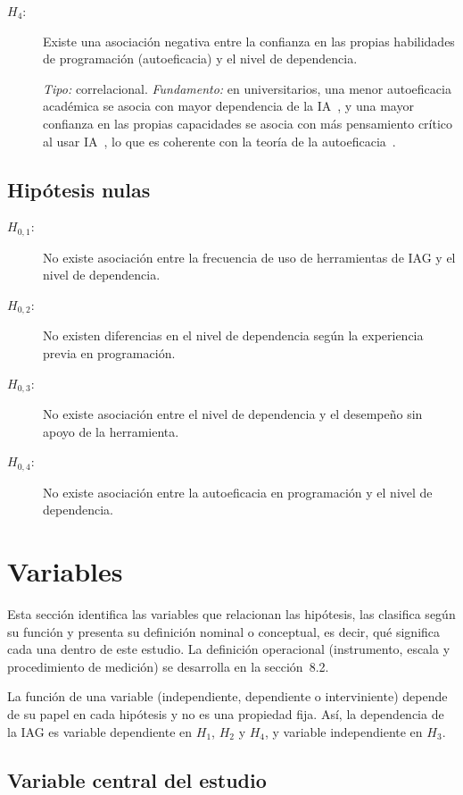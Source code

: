 \documentclass[12pt,letterpaper]{article}
\numberwithin{table}{section}
\numberwithin{figure}{section}
\begin{document}
\begin{description}
  \item[$H_4$:] Existe una asociación negativa entre la confianza en las propias habilidades de programación (autoeficacia) y el nivel de dependencia.

  \emph{Tipo:} correlacional. \emph{Fundamento:} en universitarios, una menor autoeficacia académica se asocia con mayor dependencia de la IA~\cite{zhang2024dependency}, y una mayor confianza en las propias capacidades se asocia con más pensamiento crítico al usar IA~\cite{lee2025impact}, lo que es coherente con la teoría de la autoeficacia~\cite{bandura1977self}.
\end{description}

\subsection{Hipótesis nulas}

\begin{description}
  \item[$H_{0,1}$:] No existe asociación entre la frecuencia de uso de herramientas de IAG y el nivel de dependencia.
  \item[$H_{0,2}$:] No existen diferencias en el nivel de dependencia según la experiencia previa en programación.
  \item[$H_{0,3}$:] No existe asociación entre el nivel de dependencia y el desempeño sin apoyo de la herramienta.
  \item[$H_{0,4}$:] No existe asociación entre la autoeficacia en programación y el nivel de dependencia.
\end{description}

\section{Variables}

Esta sección identifica las variables que relacionan las hipótesis, las clasifica según su función y presenta su definición nominal o conceptual, es decir, qué significa cada una dentro de este estudio. La definición operacional (instrumento, escala y procedimiento de medición) se desarrolla en la sección~8.2.

La función de una variable (independiente, dependiente o interviniente) depende de su papel en cada hipótesis y no es una propiedad fija. Así, la dependencia de la IAG es variable dependiente en $H_1$, $H_2$ y $H_4$, y variable independiente en $H_3$.

\subsection{Variable central del estudio}
\end{document}
